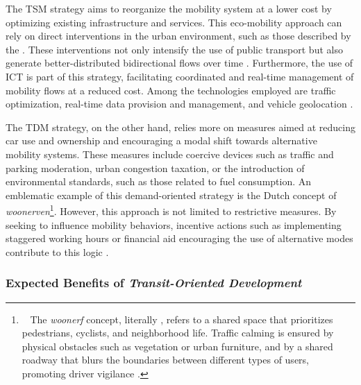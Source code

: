 \begin{refsegment}
The \acrshort{TSM} strategy aims to reorganize the mobility system at a lower cost by optimizing existing infrastructure and services. This eco-mobility approach can rely on direct interventions in the urban environment, such as those described by the . These interventions not only intensify the use of public transport but also generate better-distributed bidirectional flows over time \textcolor{blue}{\autocite[4]{grigolon_transit-oriented_2016}}. Furthermore, the use of \acrfull{ICT} is part of this strategy, facilitating coordinated and real-time management of mobility flows at a reduced cost. Among the technologies employed are traffic optimization, real-time data provision and management, and vehicle geolocation \textcolor{blue}{\autocite[96]{cervero_transit_1998}}.%

The \acrshort{TDM} strategy, on the other hand, relies more on measures aimed at reducing car use and ownership and encouraging a modal shift towards alternative mobility systems. These measures include coercive devices such as traffic and parking moderation, urban congestion taxation, or the introduction of environmental standards, such as those related to fuel consumption. An emblematic example of this demand-oriented strategy is the Dutch concept of \textsl{woonerven}\footnote{~
    The \textsl{woonerf} concept, literally , refers to a shared space that prioritizes pedestrians, cyclists, and neighborhood life. Traffic calming is ensured by physical obstacles such as vegetation or urban furniture, and by a shared roadway that blurs the boundaries between different types of users, promoting driver vigilance \textcolor{blue}{\autocite[3]{collarte_woonerf_2012}}.
}. However, this approach is not limited to restrictive measures. By seeking to influence mobility behaviors, incentive actions such as implementing staggered working hours or financial aid encouraging the use of alternative modes contribute to this logic \textcolor{blue}{\autocite[97]{cervero_transit_1998}}.%

\subsubsection*{Expected Benefits of \textsl{Transit-Oriented Development}
    \label{chap1:tod-presentation-generale-definition-effets-attendus}
    }


\end{refsegment}
